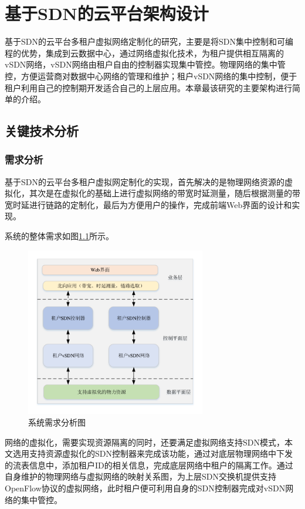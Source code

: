 \chapter{基于SDN的云平台架构设计}
基于SDN的云平台多租户虚拟网络定制化的研究，主要是将SDN集中控制和可编程的优势，集成到云数据中心，通过网络虚拟化技术，为租户提供相互隔离的vSDN网络，vSDN网络由租户自由的控制器实现集中管控。物理网络的集中管控，方便运营商对数据中心网络的管理和维护；租户vSDN网络的集中控制，便于租户利用自己的控制期开发适合自己的上层应用。本章最该研究的主要架构进行简单的介绍。
\section{关键技术分析}
\subsection{需求分析}
基于SDN的云平台多租户虚拟网定制化的实现，首先解决的是物理网络资源的虚拟化，其次是在虚拟化的基础上进行虚拟网络的带宽时延测量，随后根据测量的带宽时延进行链路的定制化，最后为方便用户的操作，完成前端Web界面的设计和实现。

系统的整体需求如图\ref{fig:demand}所示。

\begin{figure}[!htb]
  \centering
  \includegraphics[width=0.7\textwidth]{logo/demand}
  \caption{系统需求分析图}
  \label{fig:demand}
\end{figure}

网络的虚拟化，需要实现资源隔离的同时，还要满足虚拟网络支持SDN模式，本文选用支持资源虚拟化的SDN控制器来完成该功能，通过对底层物理网络中下发的流表信息中，添加租户ID的相关信息，完成底层网络中租户的隔离工作。通过自身维护的物理网络与虚拟网络的映射关系图，为上层SDN交换机提供支持OpenFlow协议的虚拟网络，此时租户便可利用自身的SDN控制器完成对vSDN网络的集中管控。

